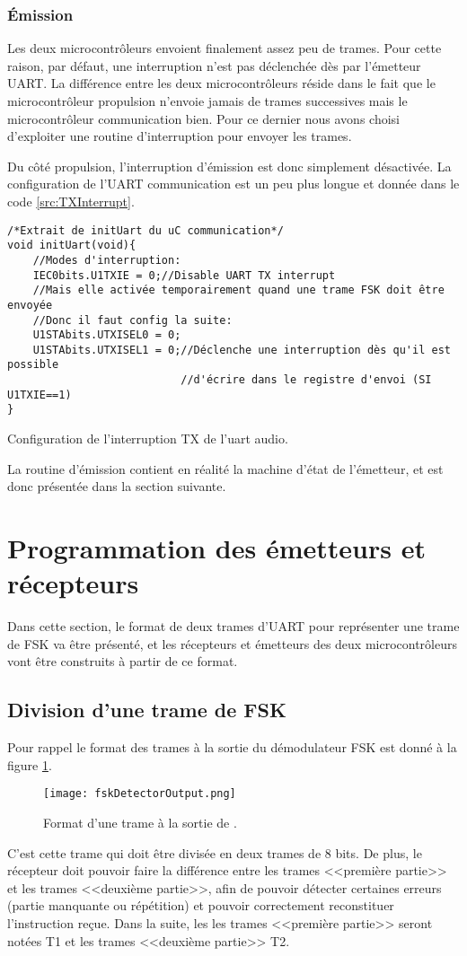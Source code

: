 \subsubsection{\'Emission}
Les deux microcontrôleurs envoient finalement assez peu de trames. Pour cette raison, par défaut, une interruption n'est pas déclenchée dès par l'émetteur UART. La différence entre les deux microcontrôleurs réside dans le fait que le microcontrôleur propulsion n'envoie jamais de trames successives mais le microcontrôleur communication bien. Pour ce dernier nous avons choisi d'exploiter une routine d'interruption pour envoyer les trames.

Du côté propulsion, l'interruption d'émission est donc simplement désactivée. La configuration de l'UART communication est un peu plus longue et donnée dans le code \ref{src:TXInterrupt}.
\begin{listing}[htbp]
\begin{verbatim}
/*Extrait de initUart du uC communication*/
void initUart(void){
    //Modes d'interruption:
    IEC0bits.U1TXIE = 0;//Disable UART TX interrupt
    //Mais elle activée temporairement quand une trame FSK doit être envoyée
    //Donc il faut config la suite:
    U1STAbits.UTXISEL0 = 0;
    U1STAbits.UTXISEL1 = 0;//Déclenche une interruption dès qu'il est possible
                           //d'écrire dans le registre d'envoi (SI U1TXIE==1)
}
\end{verbatim}
\caption{Configuration de l'interruption TX de l'uart audio.\label{src:TXInterrupt}}
\end{listing}
La routine d'émission contient en réalité la machine d'état de l'émetteur, et est donc présentée dans la section suivante.

\section{Programmation des émetteurs et récepteurs}
Dans cette section, le format de deux trames d'UART pour représenter une trame de FSK va être présenté, et les récepteurs et émetteurs des deux microcontrôleurs vont être construits à partir de ce format.

\subsection{Division d'une trame de FSK}
Pour rappel le format des trames à la sortie du démodulateur FSK est donné à la figure \ref{fig:fskDetectorOutput}.
\begin{figure}[htbp]
  \centering
  \texttt{[image: fskDetectorOutput.png]}
  \caption{Format d'une trame à la sortie de .\label{fig:fskDetectorOutput}}
\end{figure}
C'est cette trame qui doit être divisée en deux trames de 8 bits. De plus, le récepteur doit pouvoir faire la différence entre les trames <<première partie>> et les trames <<deuxième partie>>, afin de pouvoir détecter certaines erreurs (partie manquante ou répétition) et pouvoir correctement reconstituer l'instruction reçue. Dans la suite, les les trames <<première partie>> seront notées T1 et les trames <<deuxième partie>> T2.

